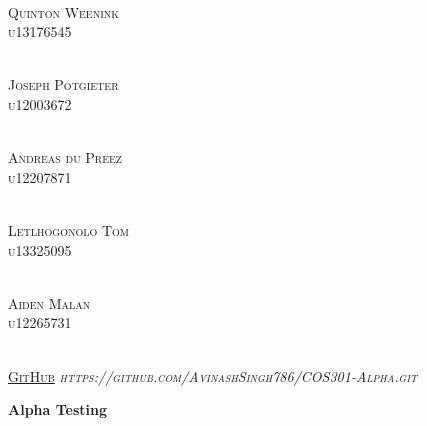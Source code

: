\documentclass{article}
\begin{document}
\begin{titlepage}
\begin{center}
\begin{multicols}{2}
	\columnbreak
	
	\textsc{\large\\
		Quinton Weenink\\
		u13176545\\
	}
	
	\textsc{\large\\
		Joseph Potgieter\\
		u12003672\\
	}
	
	\textsc{\large\\
		Andreas du Preez\\
		u12207871\\
	}
	
	\textsc{\large\\
		Letlhogonolo Tom\\
		u13325095\\
	}
	
	\textsc{\large\\
		Aiden Malan\\
		u12265731\\
	}
					
	\end{multicols}
	

	\textsc{	\\ \href{https://github.com/AvinashSingh786/people_testing.git}{GitHub}
		\textit{https://github.com/AvinashSingh786/COS301-Alpha.git}}

	\end{center}
\end{titlepage}

\tableofcontents
\thispagestyle{empty}
\cleardoublepage

\setcounter{page}{1}

   \vspace*{\fill}
   \begin{center}
	\Huge \textbf{Alpha Testing}
   \end{center}
   \vspace*{\fill}
\end{document}
